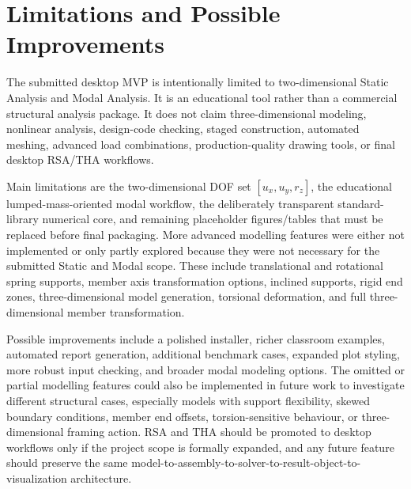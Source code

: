 \section{Limitations and Possible Improvements}

The submitted desktop MVP is intentionally limited to two-dimensional Static Analysis and Modal Analysis. It is an educational tool rather than a commercial structural analysis package. It does not claim three-dimensional modeling, nonlinear analysis, design-code checking, staged construction, automated meshing, advanced load combinations, production-quality drawing tools, or final desktop RSA/THA workflows.

Main limitations are the two-dimensional DOF set \([u_x,u_y,r_z]\), the educational lumped-mass-oriented modal workflow, the deliberately transparent standard-library numerical core, and remaining placeholder figures/tables that must be replaced before final packaging. More advanced modelling features were either not implemented or only partly explored because they were not necessary for the submitted Static and Modal scope. These include translational and rotational spring supports, member axis transformation options, inclined supports, rigid end zones, three-dimensional model generation, torsional deformation, and full three-dimensional member transformation.

Possible improvements include a polished installer, richer classroom examples, automated report generation, additional benchmark cases, expanded plot styling, more robust input checking, and broader modal modeling options. The omitted or partial modelling features could also be implemented in future work to investigate different structural cases, especially models with support flexibility, skewed boundary conditions, member end offsets, torsion-sensitive behaviour, or three-dimensional framing action. RSA and THA should be promoted to desktop workflows only if the project scope is formally expanded, and any future feature should preserve the same model-to-assembly-to-solver-to-result-object-to-visualization architecture.
